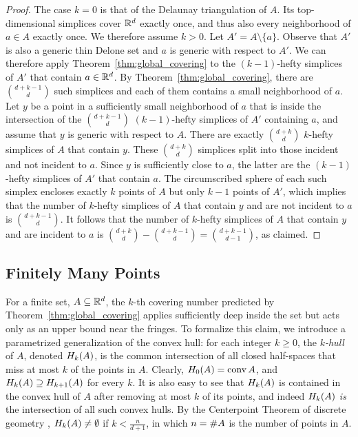 \documentclass[10pt,a4paper]{article}
\newcommand {\mm}[1] {\ifmmode{#1}\else{\mbox{\(#1\)}}\fi}
\theoremstyle{plain}
\newcommand{\Rspace}        {\mm{{\mathbb R}}}
\newcommand{\Hull}[2]       {\mm{{H}_{#1}{({#2})}}}
\newcommand{\card}[1]       {\mm{{\#}{#1}}}
\newcommand{\conv}[1]       {\mm{{\rm conv\,}{#1}}}
\begin{document}
\begin{proof}
  The case $k=0$ is that of the Delaunay triangulation of $A$.
  Its top-dimensional simplices cover $\Rspace^d$ exactly once, and thus also every neighborhood of $a \in A$ exactly once.
  We therefore assume $k > 0$. 
  Let $A' = A \setminus \{a\}$.
  Observe that $A'$ is also a generic thin Delone set and $a$ is generic with respect to $A'$.
  We can therefore apply Theorem~\ref{thm:global_covering} to the $(k-1)$-hefty simplices of $A'$ that contain $a \in \Rspace^d$.
  By Theorem~\ref{thm:global_covering}, there are $\binom{d+k-1}{d}$ such simplices and each of them contains a small neighborhood of $a$.
  \smallskip
  Let $y$ be a point in a sufficiently small neighborhood of $a$ that is inside the intersection of the $\binom{d+k-1}{d}$ $(k-1)$-hefty simplices of $A'$ containing $a$, and assume that $y$ is generic with respect to $A$.
  There are exactly $\binom{d+k}{d}$ $k$-hefty simplices of $A$ that contain $y$.
  These $\binom{d+k}{d}$ simplices split into those incident and not incident to $a$.
  Since $y$ is sufficiently close to $a$, the latter are the $(k-1)$-hefty simplices of $A'$ that contain $a$.
  The circumscribed sphere of each such simplex encloses exactly $k$ points of $A$ but only $k-1$ points of $A'$, which implies that the number of $k$-hefty simplices of $A$ that contain $y$ and are not incident to $a$ is $\binom{d+k-1}{d}$.
  It follows that the number of $k$-hefty simplices of $A$ that contain $y$ and are incident to $a$ is $\binom{d+k}{d}-\binom{d+k-1}{d}=\binom{d+k-1}{d-1}$, as claimed.
\end{proof}
\subsection{Finitely Many Points}
\label{sec:2.4}
For a finite set, $A \subseteq \Rspace^d$, the $k$-th covering number predicted by Theorem~\ref{thm:global_covering} applies sufficiently deep inside the set but acts only as an upper bound near the fringes.
To formalize this claim, we introduce a parametrized generalization of the convex hull: for each integer $k \geq 0$, the \emph{$k$-hull} of $A$, denoted $\Hull{k}{A}$, is the common intersection of all closed half-spaces that miss at most $k$ of the points in $A$.
Clearly, $\Hull{0}{A} = \conv{A}$, and $\Hull{k}{A} \supseteq \Hull{k+1}{A}$ for every $k$.
It is also easy to see that $\Hull{k}{A}$ is contained in the convex hull of $A$ after removing at most $k$ of its points, and indeed $\Hull{k}{A}$ \emph{is} the intersection of all such convex hulls.
By the Centerpoint Theorem of discrete geometry \cite[Section~4.1]{Ede87}, $\Hull{k}{A} \neq \emptyset$ if $k < \frac{n}{d+1}$, in which $n = \card{A}$ is the number of points in $A$.
\end{document}

